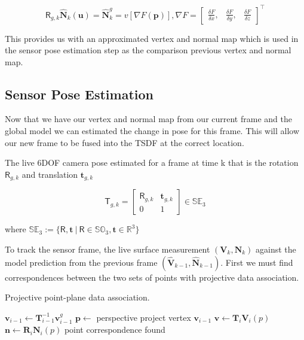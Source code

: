 \documentclass[10pt, twocolumn]{article}
\begin{document}
\begin{equation}
\mathsf{R}_{g,k} \mathbf{\hat{N}}_{k} (\mathbf{u}) = \mathbf{\hat{N}}^{g}_{k} = v[\nabla F(\mathbf{p})], \nabla F = 
\begin{bmatrix}
    \frac{\delta F}{\delta x}, & \frac{\delta F}{\delta y}, & \frac{\delta F}{\delta z}
\end{bmatrix}^{\top}
\end{equation}

This provides us with an approximated vertex and normal map which is used in the sensor pose estimation step as the comparison previous vertex and normal map.


\subsection{Sensor Pose Estimation}
Now that we have our vertex and normal map from our current frame and the global model we can estimated the change in pose for this frame. This will allow our new frame to be fused into the TSDF at the correct location.

The live 6DOF camera pose estimated for a frame at time k that is the rotation $\mathsf{R}_{g,k}$ and translation $\mathbf{t}_{g,k}$

\begin{equation}
\mathsf{T}_{g,k} = 
\begin{bmatrix}
  \mathsf{R}_{g,k} & \mathbf{t}_{g,k} \\
  0 & 1
\end{bmatrix}
\in \mathbb{SE}_{3}
\end{equation}

where $\mathbb{SE}_{3} := \{\mathsf{R}, \mathbf{t}\ |\ \mathsf{R} \in \mathbb{SO}_{3}, \mathbf{t} \in \mathbb{R}^{3}\}$

\hfill \break

To track the sensor frame, the live surface measurement $(\mathbf{V}_{k}, \mathbf{N}_{k})$ against the model prediction from the previous frame $(\mathbf{\hat{V}}_{k-1}, \mathbf{\hat{N}}_{k-1})$. First we must find correspondences between the two sets of points with projective data association. 


\begin{algorithm}
\caption{Projective point-plane data association.}\label{euclid}
\begin{algorithmic}[1]
\State $\mathbf{v}_{i-1} \leftarrow \mathbf{T}^{-1}_{i-1} \mathbf{v}^{g}_{i-1}$
\State $\mathbf{p} \leftarrow$ perspective project vertex $\mathbf{v}_{i-1}$
\State $\mathbf{v} \leftarrow \mathbf{T}_i \mathbf{V}_i(p)$
\State $\mathbf{n} \leftarrow \mathbf{R}_i \mathbf{N}_i(p)$
\State point correspondence found
\EndIf
\EndIf
\EndIf
\EndFor
\end{algorithmic}
\end{algorithm}
\end{document}
